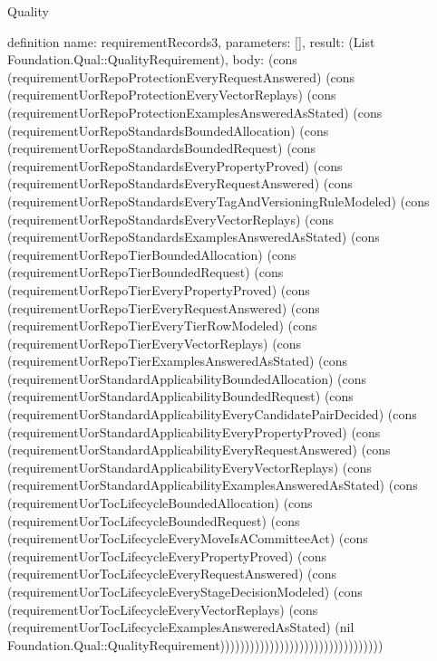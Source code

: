 \begin{lexlean}{Quality}
\begin{semanticmodule}
definition{
  name: requirementRecords3,
  parameters: [],
  result: (List Foundation.Qual::QualityRequirement),
  body: (cons (requirementUorRepoProtectionEveryRequestAnswered) (cons (requirementUorRepoProtectionEveryVectorReplays) (cons (requirementUorRepoProtectionExamplesAnsweredAsStated) (cons (requirementUorRepoStandardsBoundedAllocation) (cons (requirementUorRepoStandardsBoundedRequest) (cons (requirementUorRepoStandardsEveryPropertyProved) (cons (requirementUorRepoStandardsEveryRequestAnswered) (cons (requirementUorRepoStandardsEveryTagAndVersioningRuleModeled) (cons (requirementUorRepoStandardsEveryVectorReplays) (cons (requirementUorRepoStandardsExamplesAnsweredAsStated) (cons (requirementUorRepoTierBoundedAllocation) (cons (requirementUorRepoTierBoundedRequest) (cons (requirementUorRepoTierEveryPropertyProved) (cons (requirementUorRepoTierEveryRequestAnswered) (cons (requirementUorRepoTierEveryTierRowModeled) (cons (requirementUorRepoTierEveryVectorReplays) (cons (requirementUorRepoTierExamplesAnsweredAsStated) (cons (requirementUorStandardApplicabilityBoundedAllocation) (cons (requirementUorStandardApplicabilityBoundedRequest) (cons (requirementUorStandardApplicabilityEveryCandidatePairDecided) (cons (requirementUorStandardApplicabilityEveryPropertyProved) (cons (requirementUorStandardApplicabilityEveryRequestAnswered) (cons (requirementUorStandardApplicabilityEveryVectorReplays) (cons (requirementUorStandardApplicabilityExamplesAnsweredAsStated) (cons (requirementUorTocLifecycleBoundedAllocation) (cons (requirementUorTocLifecycleBoundedRequest) (cons (requirementUorTocLifecycleEveryMoveIsACommitteeAct) (cons (requirementUorTocLifecycleEveryPropertyProved) (cons (requirementUorTocLifecycleEveryRequestAnswered) (cons (requirementUorTocLifecycleEveryStageDecisionModeled) (cons (requirementUorTocLifecycleEveryVectorReplays) (cons (requirementUorTocLifecycleExamplesAnsweredAsStated) (nil Foundation.Qual::QualityRequirement)))))))))))))))))))))))))))))))))
}


\end{semanticmodule}
\end{lexlean}
